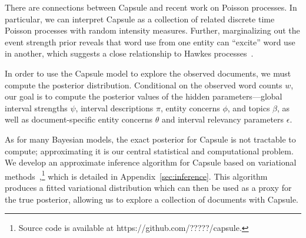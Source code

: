 There are connections between Capsule and recent work on Poisson
processes. In particular, we can interpret Capsule as a collection of
related discrete time Poisson processes with random intensity
measures. Further, marginalizing out the event strength prior reveals
that word use from one entity can ``excite'' word use in another, which
suggests a close relationship to Hawkes processes~\cite{hawkes1971spectra}.

In order to use the Capsule model to explore the observed documents, we must compute the posterior distribution.  Conditional on the observed word counts $w$, our goal is to compute the posterior values of the hidden parameters---global interval strengths $\psi$, interval descriptions $\pi$, entity concerns $\phi$, and topics $\beta$, as well as document-specific entity concerns $\theta$ and interval relevancy parameters $\epsilon$.

As for many Bayesian models, the exact posterior for Capsule is not tractable to compute; approximating it is our central statistical and computational problem.  We develop an approximate inference algorithm for Capsule based on variational methods~\cite{jordan1999introduction},\footnote{Source code is available at https://github.com/?????/capsule.} which is detailed in Appendix~\ref{sec:inference}. This algorithm produces a fitted variational distribution which can then be used as a proxy for the true posterior, allowing us to explore a collection of documents with Capsule.  




